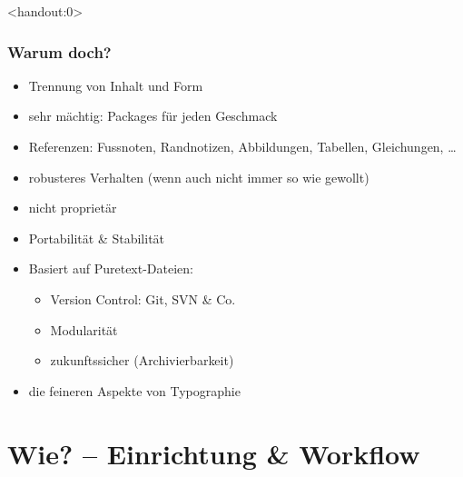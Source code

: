 \documentclass{beamer}                %
\begin{document}
\begin{frame}<handout:0>
    \frametitle{Warum doch?}
    \begin{itemize}
        \item
            Trennung von Inhalt und Form 
        \item
            sehr m\"achtig: Packages f\"ur jeden Geschmack
        \item
            Referenzen: Fussnoten,    Randnotizen,   Abbildungen,    Tabellen,
            Gleichungen, \ldots
        \item
            robusteres Verhalten (wenn auch nicht immer so wie gewollt)
        \item
            nicht propriet\"ar
        \item
            Portabilit\"at \& Stabilit\"at
        \item
            Basiert auf Puretext-Dateien:
            \begin{itemize}
                \item
                    Version Control: Git, SVN \& Co.
                \item
                    Modularit\"at
                \item
                    zukunftssicher (Archivierbarkeit)
            \end{itemize}
        \item
            die feineren Aspekte von Typographie
    \end{itemize}
\end{frame}

\section<handout:0>{Wie? -- Einrichtung \& Workflow} %
\end{document}
